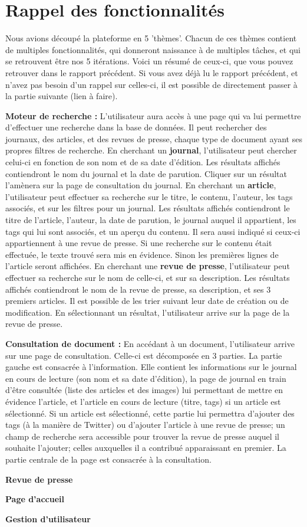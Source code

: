 \section{Rappel des fonctionnalités}

	Nous avions découpé la plateforme en 5 'thèmes'. Chacun de ces thèmes contient de multiples fonctionnalités, qui donneront naissance à de multiples tâches, et qui se retrouvent être nos 5 itérations. Voici un résumé de ceux-ci, que vous pouvez retrouver dans le rapport précédent. Si vous avez déjà lu le rapport précédent, et n'avez pas besoin d'un rappel sur celles-ci, il est possible de directement passer à la partie suivante (lien à faire).

	\textbf{Moteur de recherche :} L'utilisateur aura accès à une page qui va lui permettre d'effectuer une recherche dans la base de données. Il peut rechercher des journaux, des articles, et des revues de presse, chaque type de document ayant ses propres filtres de recherche. En cherchant un \textbf{journal}, l'utilisateur peut chercher celui-ci en fonction de son nom et de sa date d'édition. Les résultats affichés contiendront le nom du journal et la date de parution. Cliquer sur un résultat l'amènera sur la page de consultation du journal. En cherchant un \textbf{article}, l'utilisateur peut effectuer sa recherche sur le titre, le contenu, l'auteur, les tags associés, et sur les filtres pour un journal. Les résultats affichés contiendront le titre de l'article, l'auteur, la date de parution, le journal auquel il appartient, les tags qui lui sont associés, et un aperçu du contenu. Il sera aussi indiqué si ceux-ci appartiennent à une revue de presse. Si une recherche sur le contenu était effectuée, le texte trouvé sera mis en évidence. Sinon les premières lignes de l'article seront affichées. En cherchant une \textbf{revue de presse}, l'utilisateur peut effectuer sa recherche sur le nom de celle-ci, et sur sa description. Les résultats affichés contiendront le nom de la revue de presse, sa description, et ses 3 premiers articles. Il est possible de les trier suivant leur date de création ou de modification. En sélectionnant un résultat, l'utilisateur arrive sur la page de la revue de presse. 

	\textbf{Consultation de document :} En accédant à un document, l'utilisateur arrive sur une page de consultation. Celle-ci est décomposée en 3 parties. La partie gauche est consacrée à l'information. Elle contient les informations sur le journal en cours de lecture (son nom et sa date d'édition), la page de journal en train d'être consultée (liste des articles et des images) lui permettant de mettre en évidence l'article, et l'article en cours de lecture (titre, tags) si un article est sélectionné. Si un article est sélectionné, cette partie lui permettra d'ajouter des tags (à la manière de Twitter) ou d'ajouter l'article à une revue de presse; un champ de recherche sera accessible pour trouver la revue de presse auquel il souhaite l'ajouter; celles auxquelles il a contribué apparaissant en premier. La partie centrale de la page est consacrée à la consultation. 

	\textbf{Revue de presse}

	\textbf{Page d'accueil}

	\textbf{Gestion d'utilisateur}